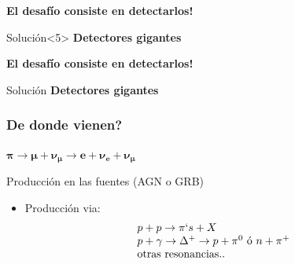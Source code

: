 \begin{frame}
\begin{textblock}{7}
\begin{overprint}
		\vspace*{1cm}
		\begin{block}{}
		\centering 
		\textbf{El desaf\'io consiste en detectarlos!}
		\end{block}
		\vfill
		\begin{alertblock}{Soluci\'on}<5>
		\centering 
		\textbf{Detectores gigantes}
		\end{alertblock}
		\vfill
	\onslide<5>
		\vspace*{1cm}
		\begin{block}{}
		\centering 
		\textbf{El desaf\'io consiste en detectarlos!}
		\end{block}
		\begin{alertblock}{Soluci\'on}
		\centering 
		\textbf{Detectores gigantes}
		\end{alertblock}
   \end{overprint}
 \end{textblock}
\end{frame}

\begin{frame}
 \frametitle{De donde vienen?}
 \begin{alertblock}{}
  \centering
  $\bm{\pi\rightarrow\mu+\nu_\mu\rightarrow e + \nu_e + \nu_\mu}$
 \end{alertblock}

 \begin{block}{Producci\'on en las fuentes (AGN o GRB)}
  \begin{itemize}
   \item Producci\'on via:
   \begin{displaymath}
    \begin{array}{l}
		p + p \rightarrow \pi`s + X \\
		p + \gamma \rightarrow \Delta^{+} \rightarrow p +\pi^{0}\,\,{\rm \acute{o}}\,\, n +\pi^{+} \\
        {\rm otras\,\, resonancias..}
	\end{array}
   \end{displaymath}
  \end{itemize}
 \end{block}
 \vfill
 \begin{center}
 \end{center}
 \vfill
\end{frame}

